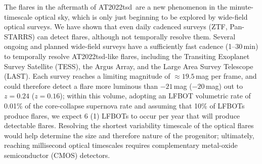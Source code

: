 \documentclass{nature_plusfigure}
\newcommand{\at}{AT2022tsd}
\begin{document}
The flares in the aftermath of \at\ are a new phenomenon in the minute-timescale optical sky, which is only just beginning to be explored by wide-field optical surveys\cite{Andreoni2020,Richmond2020,Corbett2023,Ofek2023}.
We have shown that even daily cadenced surveys (ZTF, Pan-STARRS) can detect flares, although not temporally resolve them. Several ongoing and planned wide-field surveys have a sufficiently fast cadence (1--30\,min) to temporally resolve \at-like flares, including the Transiting Exoplanet Survey Satellite (TESS\cite{Ricker2015}), the Argus Array\cite{Law2022}, and the Large Area Survey Telescope (LAST\cite{Ofek2023}). Each survey reaches a limiting magnitude of $\approx19.5$\,mag per frame, and could therefore detect a flare more luminous than $-21$\,mag ($-20$\,mag) out to $z=0.24$ ($z=0.16$);
within this volume, adopting an LFBOT volumetric rate of 0.01\% of the core-collapse supernova rate\cite{Ho2022_RET} and assuming that 10\% of LFBOTs produce flares, we expect 6 (1) LFBOTs to occur per year that will produce detectable flares.
Resolving the shortest variability timescale of the optical flares would help determine the size and therefore nature of the progenitor; ultimately, reaching millisecond optical timescales requires complementary metal-oxide semiconductor (CMOS) detectors.


\newpage
\end{document}
